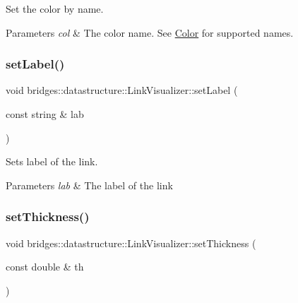 Set the color by name. 


\begin{DoxyParams}{Parameters}
{\em col} & The color name. See \hyperlink{classbridges_1_1datastructure_1_1_color}{Color} for supported names. \\
\hline
\end{DoxyParams}
\mbox{\label{classbridges_1_1datastructure_1_1_link_visualizer_a20ed50bf0e02f79dda0cb54c3af722fe}} 
\subsubsection{\texorpdfstring{set\+Label()}{setLabel()}}
{\footnotesize\ttfamily void bridges\+::datastructure\+::\+Link\+Visualizer\+::set\+Label (\begin{DoxyParamCaption}\item[{const string \&}]{lab }\end{DoxyParamCaption})\hspace{0.3cm}{\ttfamily [inline]}}



Sets label of the link. 


\begin{DoxyParams}{Parameters}
{\em lab} & The label of the link \\
\hline
\end{DoxyParams}
\mbox{\label{classbridges_1_1datastructure_1_1_link_visualizer_acac8af8117ea32ccc1c3bf9843db9881}} 
\subsubsection{\texorpdfstring{set\+Thickness()}{setThickness()}}
{\footnotesize\ttfamily void bridges\+::datastructure\+::\+Link\+Visualizer\+::set\+Thickness (\begin{DoxyParamCaption}\item[{const double \&}]{th }\end{DoxyParamCaption})\hspace{0.3cm}{\ttfamily [inline]}}

